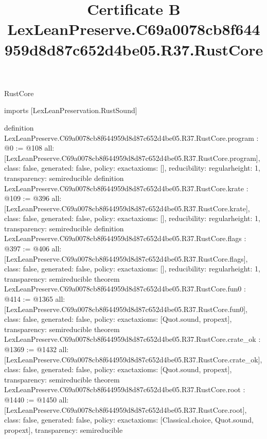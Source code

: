 \begin{lexlean}{RustCore}
\title{Certificate B LexLeanPreserve.C69a0078cb8f644959d8d87c652d4be05.R37.RustCore}
\begin{coremodule}
imports [LexLeanPreservation.RustSound]

definition LexLeanPreserve.C69a0078cb8f644959d8d87c652d4be05.R37.RustCore.program : @0 := @108 {
  all: [LexLeanPreserve.C69a0078cb8f644959d8d87c652d4be05.R37.RustCore.program],
  class: false,
  generated: false,
  policy: exact{axioms: []},
  reducibility: regular{height: 1},
  transparency: semireducible
}
definition LexLeanPreserve.C69a0078cb8f644959d8d87c652d4be05.R37.RustCore.krate : @109 := @396 {
  all: [LexLeanPreserve.C69a0078cb8f644959d8d87c652d4be05.R37.RustCore.krate],
  class: false,
  generated: false,
  policy: exact{axioms: []},
  reducibility: regular{height: 1},
  transparency: semireducible
}
definition LexLeanPreserve.C69a0078cb8f644959d8d87c652d4be05.R37.RustCore.flags : @397 := @406 {
  all: [LexLeanPreserve.C69a0078cb8f644959d8d87c652d4be05.R37.RustCore.flags],
  class: false,
  generated: false,
  policy: exact{axioms: []},
  reducibility: regular{height: 1},
  transparency: semireducible
}
theorem LexLeanPreserve.C69a0078cb8f644959d8d87c652d4be05.R37.RustCore.fun0 : @414 := @1365 {
  all: [LexLeanPreserve.C69a0078cb8f644959d8d87c652d4be05.R37.RustCore.fun0],
  class: false,
  generated: false,
  policy: exact{axioms: [Quot.sound, propext]},
  transparency: semireducible
}
theorem LexLeanPreserve.C69a0078cb8f644959d8d87c652d4be05.R37.RustCore.crate_ok : @1369 := @1432 {
  all: [LexLeanPreserve.C69a0078cb8f644959d8d87c652d4be05.R37.RustCore.crate_ok],
  class: false,
  generated: false,
  policy: exact{axioms: [Quot.sound, propext]},
  transparency: semireducible
}
theorem LexLeanPreserve.C69a0078cb8f644959d8d87c652d4be05.R37.RustCore.root : @1440 := @1450 {
  all: [LexLeanPreserve.C69a0078cb8f644959d8d87c652d4be05.R37.RustCore.root],
  class: false,
  generated: false,
  policy: exact{axioms: [Classical.choice, Quot.sound, propext]},
  transparency: semireducible
}


\end{coremodule}
\end{lexlean}
